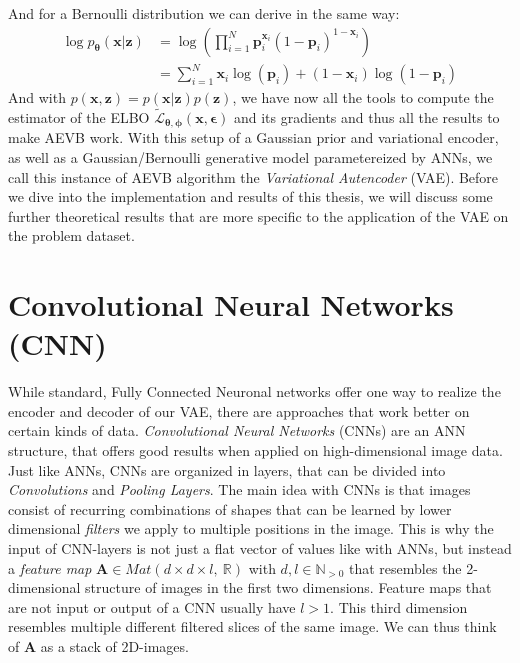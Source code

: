 \documentclass[12pt]{report}
\theoremstyle{definition}
\begin{document}
And for a Bernoulli distribution we can derive in the same way:
\begin{equation}
\begin{split}
\log p_{\pmb{\theta}}(\mathbf{x}|\mathbf{z}) 
& = \log \left(\prod_{i=1}^N \mathbf{p}_i^{\mathbf{x}_i}(1-\mathbf{p}_i)^{1-\mathbf{x}_i}\right) \\
& = \sum_{i=1}^N \mathbf{x}_i \log(\mathbf{p}_i) + (1 - \mathbf{x}_i) \log(1 - \mathbf{p}_i)
\end{split}
\end{equation}
And with $p(\mathbf{x}, \mathbf{z}) = p(\mathbf{x}|\mathbf{z})p(\mathbf{z})$, we have now all the tools to compute the estimator of the ELBO $\tilde{\mathcal{L}}_{\pmb{\theta}, \pmb{\phi}}(\mathbf{x}, \pmb{\epsilon})$ and its gradients and thus all the results to make AEVB work. With this setup of a Gaussian prior and variational encoder, as well as a Gaussian/Bernoulli generative model parametereized by ANNs, we call this instance of AEVB algorithm the \emph{Variational Autencoder} (VAE). Before we dive into the implementation and results of this thesis, we will discuss some further theoretical results that are more specific to the application of the VAE on the problem dataset. 


\section{Convolutional Neural Networks (CNN)}
While standard, Fully Connected Neuronal networks offer one way to realize the encoder and decoder of our VAE, there are approaches that work better on certain kinds of data. \emph{Convolutional Neural Networks} (CNNs) are an ANN structure, that offers good results when applied on high-dimensional image data. Just like ANNs, CNNs are organized in layers, that can be divided into \emph{Convolutions} and \emph{Pooling Layers}.
The main idea with CNNs is that images consist of recurring combinations of shapes that can be learned by lower dimensional \emph{filters} we apply to multiple positions in the image. This is why the input of CNN-layers is not just a flat vector of values like with ANNs, but instead a \emph{feature map} $\mathbf{A} \in Mat(d \times d \times l, \ \mathbb{R})$ with $d, l \in \mathbb{N}_{>0}$ that resembles the 2-dimensional structure of images in the first two dimensions. Feature maps that are not input or output of a CNN usually have $l>1$. This third dimension resembles multiple different filtered slices of the same image. We can thus think of $\mathbf{A}$ as a stack of 2D-images.
\end{document}
